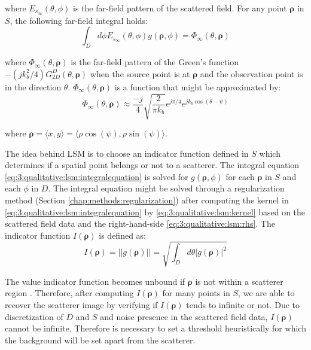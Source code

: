 			\noindent where $E_{s_\infty}(\theta, \phi)$ is the far-field pattern of the scattered field. For any point $\boldsymbol{\rho}$ in $S$, the following far-field integral holds:
			\begin{equation}
				\int_D d\phi E_{s_\infty}(\theta, \phi) g(\boldsymbol{\rho}, \phi) = \Phi_\infty(\theta, \boldsymbol{\rho}) \label{eq:3:qualitative:lsm:integralequation}
			\end{equation}
		
			\noindent where $\Phi_\infty(\theta, \boldsymbol{\rho})$ is the far-field pattern of the Green's function $-(jk_b^2/4)G^D_{2D}(\theta,\boldsymbol{\rho})$ when the source point is at $\boldsymbol{\rho}$ and the observation point is in the direction $\theta$. $\Phi_\infty(\theta, \boldsymbol{\rho})$ is a function that might be approximated by:
			\begin{equation}
				\Phi_\infty(\theta, \boldsymbol{\rho}) \approx \frac{-j}{4}\sqrt{\frac{2}{\pi k_b}}e^{j\pi/4}e^{jk_b\cos(\theta-\psi)}  \label{eq:3:qualitative:lsm:rhs}
			\end{equation}
		
			\noindent where $\boldsymbol{\rho} = \langle x, y \rangle =  \langle \rho\cos(\psi), \rho\sin(\psi)\rangle$.
			
			The idea behind LSM is to choose an indicator function defined in $S$ which determines if a spatial point belongs or not to a scatterer. The integral equation \eqref{eq:3:qualitative:lsm:integralequation} is solved for $g(\boldsymbol{\rho}, \phi)$ for each $\boldsymbol{\rho}$ in $S$ and each $\phi$ in $D$. The integral equation might be solved through a regularization method (Section \ref{chap:methods:regularization}) after computing the kernel in \eqref{eq:3:qualitative:lsm:integralequation} by \eqref{eq:3:qualitative:lsm:kernel} based on the scattered field data and the right-hand-side \eqref{eq:3:qualitative:lsm:rhs}. The indicator function $I(\boldsymbol{\rho})$ is defined as:
			\begin{equation}
				I(\boldsymbol{\rho}) = ||g(\boldsymbol{\rho})|| = \sqrt{\int_D d\theta |g(\boldsymbol{\rho})|^2} \label{eq:3:qualitative:lsm:indicator}
			\end{equation}
		
			The value indicator function becomes unbound if $\boldsymbol{\rho}$ is not within a scatterer region \citep{colton1996simple}. Therefore, after computing $I(\boldsymbol{\rho})$ for many points in $S$, we are able to recover the scatterer image by verifying if $I(\boldsymbol{\rho})$ tends to infinite or not. Due to discretization of $D$ and $S$ and noise presence in the scattered field data, $I(\boldsymbol{\rho})$ cannot be infinite. Therefore is necessary to set a threshold heuristically for which the background will be set apart from the scatterer.
			
